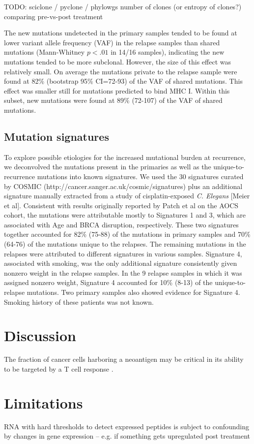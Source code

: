 TODO: sciclone / pyclone / phylowgs number of clones (or entropy of clones?) comparing pre-vs-post treatment

The new mutations undetected in the primary samples tended to be found at lower variant allele frequency (VAF) in the relapse samples than shared mutations (Mann-Whitney $p \lt .01$ in 14/16 samples), indicating the new mutations tended to be more subclonal. However, the size of this effect was relatively small. On average the mutations private to the relapse sample were found at 82\% (bootstrap 95\% CI=72-93) of the VAF of shared mutations. This effect was smaller still for mutations predicted to bind MHC I. Within this subset, new mutations were found at 89\% (72-107) of the VAF of shared mutations.

\subsection*{Mutation signatures}
To explore possible etiologies for the increased mutational burden at recurrence, we deconvolved the mutations present in the primaries as well as the unique-to-recurrence mutations into known signatures. We used the 30 signatures curated by COSMIC (http://cancer.sanger.ac.uk/cosmic/signatures) plus an additional signature manually extracted from a study of cisplatin-exposed \textit{C. Elegans} [Meier et al]. Consistent with results originally reported by Patch et al on the AOCS cohort, the mutations were attributable mostly to Signatures 1 and 3, which are associated with Age and BRCA disruption, respectively. These two signatures together accounted for 82\% (75-88) of the mutations in primary samples and 70\% (64-76) of the mutations unique to the relapses. The remaining mutations in the relapses were attributed to different signatures in various samples. Signature 4, associated with smoking, was the only additional signature consistently given nonzero weight in the relapse samples. In the 9 relapse samples in which it was assigned nonzero weight, Signature 4 accounted for 10\% (8-13) of the unique-to-relapse mutations. Two primary samples also showed evidence for Signature 4. Smoking history of these patients was not known.


\section*{Discussion}

The fraction of cancer cells harboring a neoantigen may be critical in its ability to be targeted by a T cell response \cite{McGranahan_2016}.

\section*{Limitations}
RNA with hard thresholds to detect expressed peptides is subject to confounding by changes in gene expression -- e.g. if something gets upregulated post treatment





